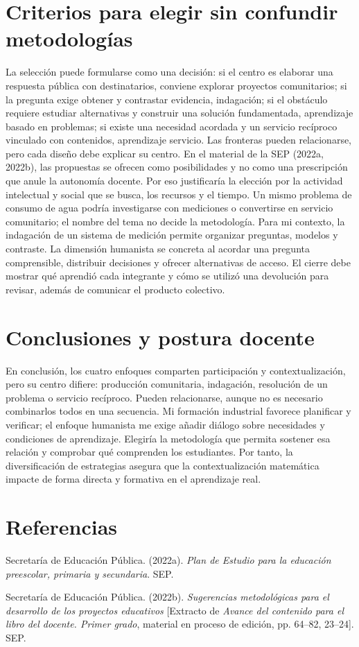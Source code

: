 \documentclass[spanish,letterpaper,oneside]{article}
\begin{document}
\section{Criterios para elegir sin confundir metodologías}
La selección puede formularse como una decisión: si el centro es elaborar una respuesta pública con destinatarios, conviene explorar proyectos comunitarios; si la pregunta exige obtener y contrastar evidencia, indagación; si el obstáculo requiere estudiar alternativas y construir una solución fundamentada, aprendizaje basado en problemas; si existe una necesidad acordada y un servicio recíproco vinculado con contenidos, aprendizaje servicio. Las fronteras pueden relacionarse, pero cada diseño debe explicar su centro.
En el material de la SEP (2022a, 2022b), las propuestas se ofrecen como posibilidades y no como una prescripción que anule la autonomía docente. Por eso justificaría la elección por la actividad intelectual y social que se busca, los recursos y el tiempo. Un mismo problema de consumo de agua podría investigarse con mediciones o convertirse en servicio comunitario; el nombre del tema no decide la metodología.
Para mi contexto, la indagación de un sistema de medición permite organizar preguntas, modelos y contraste. La dimensión humanista se concreta al acordar una pregunta comprensible, distribuir decisiones y ofrecer alternativas de acceso. El cierre debe mostrar qué aprendió cada integrante y cómo se utilizó una devolución para revisar, además de comunicar el producto colectivo.

\section{Conclusiones y postura docente}
En conclusión, los cuatro enfoques comparten participación y contextualización, pero su centro difiere: producción comunitaria, indagación, resolución de un problema o servicio recíproco. Pueden relacionarse, aunque no es necesario combinarlos todos en una secuencia. Mi formación industrial favorece planificar y verificar; el enfoque humanista me exige añadir diálogo sobre necesidades y condiciones de aprendizaje. Elegiría la metodología que permita sostener esa relación y comprobar qué comprenden los estudiantes. Por tanto, la diversificación de estrategias asegura que la contextualización matemática impacte de forma directa y formativa en el aprendizaje real.

\section*{Referencias}
{\setlength{\parskip}{6pt}
\par\hangindent=1.27cm  Secretaría de Educación Pública. (2022a). \textit{Plan de Estudio para la educación preescolar, primaria y secundaria}. SEP.
\par\hangindent=1.27cm  Secretaría de Educación Pública. (2022b). \textit{Sugerencias metodológicas para el desarrollo de los proyectos educativos} [Extracto de \textit{Avance del contenido para el libro del docente. Primer grado}, material en proceso de edición, pp. 64--82, 23--24]. SEP.
}
\end{document}
